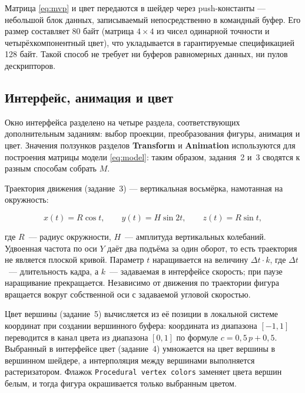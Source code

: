 \documentclass[14pt,a4paper]{extarticle}
\begin{document}
Матрица \eqref{eq:mvp} и цвет передаются в шейдер через push-константы —
небольшой блок данных, записываемый непосредственно в командный буфер. Его
размер составляет 80 байт (матрица $4\times4$ из чисел одинарной точности и
четырёхкомпонентный цвет), что укладывается в гарантируемые спецификацией
128 байт. Такой способ не требует ни буферов равномерных данных, ни пулов
дескрипторов.

\subsection{Интерфейс, анимация и цвет}

Окно интерфейса разделено на четыре раздела, соответствующих дополнительным
заданиям: выбор проекции, преобразования фигуры, анимация и цвет. Значения
ползунков разделов \textbf{Transform} и \textbf{Animation} используются для
построения матрицы модели \eqref{eq:model}: таким образом, задания~2 и~3
сводятся к разным способам собрать $M$.

Траектория движения (задание~3) — вертикальная восьмёрка, намотанная на
окружность:

\begin{equation}
	x(t) = R\cos t, \qquad
	y(t) = H\sin 2t, \qquad
	z(t) = R\sin t,
\end{equation}

где $R$~— радиус окружности, $H$~— амплитуда вертикальных колебаний. Удвоенная
частота по оси $Y$ даёт два подъёма за один оборот, то есть траектория не
является плоской кривой. Параметр $t$ наращивается на величину
$\Delta t \cdot k$, где $\Delta t$~— длительность кадра, а $k$~— задаваемая в
интерфейсе скорость; при паузе наращивание прекращается. Независимо от движения
по траектории фигура вращается вокруг собственной оси с задаваемой угловой
скоростью.

Цвет вершины (задание~5) вычисляется из её позиции в локальной системе
координат при создании вершинного буфера: координата из диапазона $[-1, 1]$
переводится в канал цвета из диапазона $[0, 1]$ по формуле
$c = 0{,}5\,p + 0{,}5$. Выбранный в интерфейсе цвет (задание~4) умножается на
цвет вершины в вершинном шейдере, а интерполяция между вершинами выполняется
растеризатором. Флажок \texttt{Procedural vertex colors} заменяет цвета вершин
белым, и тогда фигура окрашивается только выбранным цветом.


\end{document}
